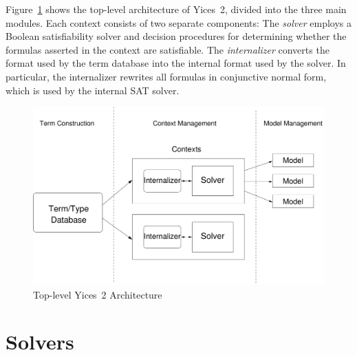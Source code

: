 \documentclass[11pt,twoside,fleqn,openright,titlepage]{cslreport}
\begin{document}
Figure~\ref{top-level-architecture}  shows the  top-level architecture
of Yices~2, divided into the three main modules. Each context consists
of  two separate  components:  The {\em  solver\/}  employs a  Boolean
satisfiability solver and  decision procedures for determining whether
the   formulas  asserted   in  the   context  are   satisfiable.   The
\emph{internalizer\/} converts  the format  used by the  term database
into  the internal  format used  by  the solver.   In particular,  the
internalizer rewrites  all formulas in conjunctive  normal form, which
is used by the internal SAT solver.
\begin{figure}
\includegraphics[width=13.8cm]{yices2-toplevel}
\caption{Top-level Yices~2 Architecture}
\label{top-level-architecture}
\end{figure}


\section{Solvers}
\label{solvers}
\end{document}
